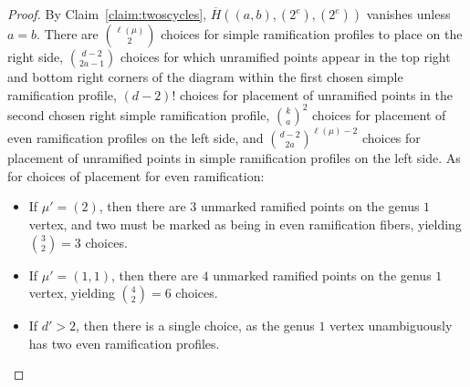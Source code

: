 \documentclass[thesis]{thesis-umich}           %
\theoremstyle{definition}
\begin{document}
\begin{proof}
                By Claim~\ref{claim:twoscycles}, $\overline H((a,b),(2^e),(2^e))$ vanishes unless $a=b$.
                There are $\binom{\ell(\mu)}{2}$ choices for simple ramification profiles to place on the right
                side, $\binom{d-2}{2a-1}$ choices for which unramified points appear in the top right
                and bottom right corners of the diagram within the first chosen simple ramification profile,
                $(d-2)!$ choices for placement of unramified points in the second chosen
                right simple ramification profile, $\binom ka^2$ choices for placement of even ramification profiles
                on the left side, and $\binom{d-2}{2a}^{\ell(\mu)-2}$ choices for placement of unramified points in
                simple ramification profiles on the left side.
                As for choices of placement for even ramification:
                \begin{itemize}
                  \item
                If $\mu'=(2)$, then there are $3$ unmarked ramified points on
                the genus $1$ vertex, and two must be marked as being in
                even ramification fibers, yielding $\binom 32=3$ choices.
              \item If $\mu'=(1,1)$, then there are
                $4$ unmarked ramified points on the genus $1$ vertex,
                yielding $\binom 42=6$ choices.
              \item If $d'>2$, then there is a single choice, as the
                genus $1$ vertex unambiguously has two even ramification profiles.
                \end{itemize}
                


\end{proof}
\end{document}
